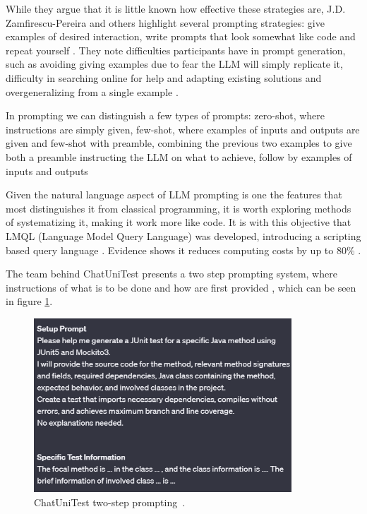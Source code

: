 While they argue that it is little known how effective these strategies are, J.D. Zamfirescu-Pereira and others highlight several prompting strategies: give examples of desired interaction, write prompts that look somewhat like code and repeat yourself \citep{kn:johnny}. They note difficulties participants have in prompt generation, such as avoiding giving examples due to fear the LLM will simply replicate it, difficulty in searching online for help and adapting existing solutions and overgeneralizing from a single example \citep{kn:johnny}.

In prompting we can distinguish a few types of prompts: zero-shot, where instructions are simply given, few-shot, where examples of inputs and outputs are given and few-shot with preamble, combining the previous two examples to give both a preamble instructing the LLM on what to achieve, follow by examples of inputs and outputs \citep{kn:promptprofiannaca}

Given the natural language aspect of LLM prompting is one the features that most distinguishes it from classical programming, it is worth exploring methods of systematizing it, making it work more like code. It is with this objective that LMQL (Language Model Query Language) was developed, introducing a scripting based query language \citep{kn:lmql}. Evidence shows it reduces computing costs by up to 80\% \citep{kn:lmql}.

The team behind ChatUniTest presents a two step prompting system, where instructions of what is to be done and how are first provided \citep{kn:chatunitest}, which can be seen in figure \ref{fig:chunit}.

\begin{figure}
    \centering
    \includegraphics[width=0.86\textwidth]{figures/chatunittestprompt.png}
    \caption{ChatUniTest two-step prompting~\cite{kn:chatunitest}.}
    \label{fig:chunit}
\end{figure}


